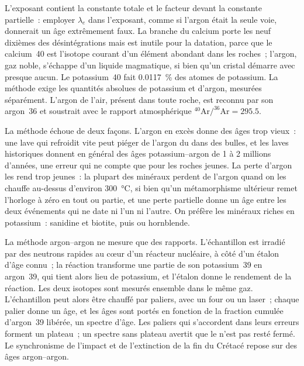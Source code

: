 L'exposant contient la constante totale et le facteur devant la constante partielle~:
employer $\lambda_e$ dans l'exposant, comme si l'argon était la seule voie, donnerait
un âge extrêmement faux. La branche du calcium porte les neuf dixièmes des désintégrations mais est
inutile pour la datation, parce que le calcium~40 est l'isotope courant d'un élément
abondant dans les roches~; l'argon, gaz noble, s'échappe d'un liquide magmatique, si bien qu'un cristal
démarre avec presque aucun. Le potassium~40 fait \qty{0.0117}{\percent} des atomes de
potassium. La méthode exige les quantités absolues de potassium et d'argon,
mesurées séparément. L'argon de l'air, présent dans toute roche, est reconnu par
son argon~36 et soustrait avec le rapport atmosphérique
$^{40}\mathrm{Ar}/^{36}\mathrm{Ar} = 295.5$.

La méthode échoue de deux façons. L'argon en excès donne des âges trop vieux~: une lave qui
refroidit vite peut piéger de l'argon du  dans des bulles, et les laves historiques
donnent en général des âges potassium--argon de 1 à 2 millions d'années, une erreur qui
ne compte que pour les roches jeunes. La perte d'argon les rend trop jeunes~: la plupart des minéraux
perdent de l'argon quand on les chauffe au-dessus d'environ \qty{300}{\celsius}, si bien qu'un
métamorphisme ultérieur remet l'horloge à zéro en tout ou partie, et une perte partielle donne un âge
entre les deux événements qui ne date ni l'un ni l'autre. On préfère les minéraux riches en potassium~:
sanidine et biotite, puis  ou hornblende.

La méthode argon--argon ne mesure que des rapports. L'échantillon est irradié par des
neutrons rapides au cœur d'un réacteur nucléaire, à côté d'un  étalon
d'âge connu~; la réaction transforme une partie de son potassium~39 en argon~39, qui
tient alors lieu de potassium, et l'étalon donne le rendement de la réaction. Les
deux isotopes sont mesurés ensemble dans le même gaz. L'échantillon peut alors être
chauffé par paliers, avec un four ou un laser~; chaque palier donne un âge, et les
âges sont portés en fonction de la fraction cumulée d'argon~39 libérée, un spectre
d'âge. Les paliers qui s'accordent dans leurs erreurs forment un plateau~; un spectre
sans plateau avertit que le  n'est pas resté fermé. Le synchronisme de
l'impact et de l'extinction de la fin du Crétacé repose sur des âges argon--argon.

